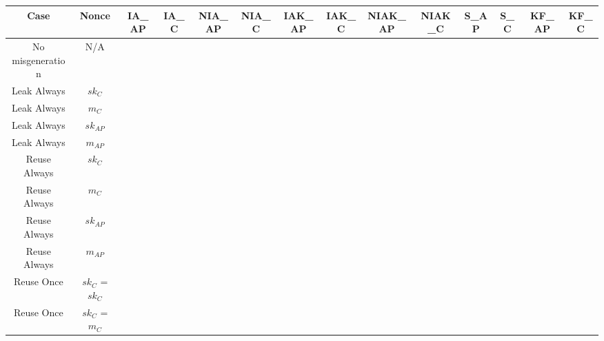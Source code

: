 \documentclass[crop]{standalone}
\newcommand{\noattack}{\color{ForestGreen}\usym{2713}\color{black}}
\newcommand{\attack}{\color{red}\usym{2717}\color{black}}
\begin{document}
\parbox{30cm}{
\begin{tabular}{|c|c|c|c|c|c|c|c|c|c|c|c|c|c|}
\hline
Case & Nonce & IA\_AP & IA\_C & NIA\_AP & NIA\_C & IAK\_AP & IAK\_C & NIAK\_AP & NIAK\_C & S\_AP & S\_C & KF\_AP & KF\_C \\ \hline
No misgeneration & N/A & \noattack & \noattack & \noattack & \noattack & \noattack & \noattack & \noattack & \noattack & \noattack & \noattack & \noattack & \noattack\\ \hline
Leak Always & $sk_C$ & \attack & \attack & \attack & \attack & \attack & \attack & \attack & \attack & \attack & \attack & \noattack & \attack\\ \hline
Leak Always & $m_C$ & \attack & \attack & \attack & \attack & \attack & \attack & \attack & \attack & \attack & \attack & \noattack & \attack\\ \hline
Leak Always & $sk_{AP}$ & \attack & \attack & \attack & \attack & \attack & \attack & \attack & \attack & \attack & \attack & \attack & \noattack\\ \hline
Leak Always & $m_{AP}$ & \attack & \attack & \attack & \attack & \attack & \attack & \attack & \attack & \attack & \attack & \noattack & \noattack\\ \hline
Reuse Always & $sk_C$ & \noattack & \noattack & \noattack & \noattack & \noattack & \noattack & \noattack & \noattack & \noattack & \noattack & \noattack & \noattack\\ \hline
Reuse Always & $m_C$ & \noattack & \noattack & \noattack & \noattack & \noattack & \noattack & \noattack & \noattack & \noattack & \noattack & \noattack & \noattack\\ \hline
Reuse Always & $sk_{AP}$ & \noattack & \noattack & \noattack & \noattack & \noattack & \noattack & \noattack & \noattack & \noattack & \noattack & \noattack & \noattack\\ \hline
Reuse Always & $m_{AP}$ & \noattack & \noattack & \noattack & \noattack & \noattack & \noattack & \noattack & \noattack & \noattack & \noattack & \noattack & \noattack\\ \hline
Reuse Once & $sk_C$ = $sk_C$ & \noattack & \noattack & \noattack & \noattack & \noattack & \noattack & \noattack & \noattack & \noattack & \noattack & \noattack & \noattack\\ \hline
Reuse Once & $sk_C$ = $m_C$ & \noattack & \noattack & \noattack & \noattack & \noattack & \noattack & \noattack & \noattack & \noattack & \noattack & \noattack & \noattack\\ \hline

\end{tabular}}
\end{document}
